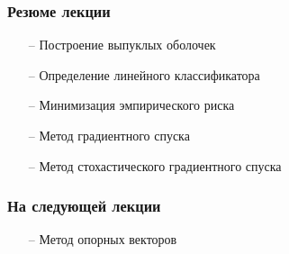 \documentclass[12pt]{beamer}
\begin{document}
\begin{frame}\frametitle{Резюме лекции}
\begin{itemize}
\item[--] Построение выпуклых оболочек
\item[--] Определение линейного классификатора
\item[--] Минимизация эмпирического риска
\item[--] Метод градиентного спуска
\item[--] Метод стохастического градиентного спуска
\end{itemize}
\end{frame}

\begin{frame}\frametitle{На следующей лекции}
\begin{itemize}
\item[--] Метод опорных векторов
\end{itemize}
\end{frame}
\end{document}
